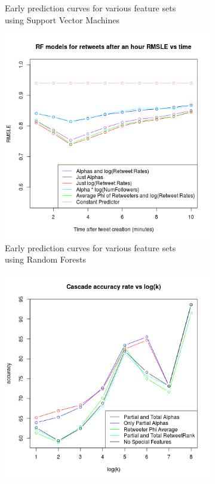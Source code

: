 \begin{figure}
\begin{subfigure}[b]{0.45\textwidth}
    \caption{Early prediction curves for various feature sets\\ using Support Vector Machines}
    \label{fig:svmattempts}  
  \end{subfigure}
  \begin{subfigure}[b]{0.45\textwidth}
    \includegraphics[width=\textwidth]{../src/Analysis/rfattempts.png}
    \caption{Early prediction curves for various feature sets \\using Random Forests}
    \label{fig:rfattempts}  
  \end{subfigure}%
  \begin{subfigure}[b]{0.45\textwidth}
    \includegraphics[width=\textwidth]{../src/Analysis/jurerocks.png}

\end{subfigure}
\end{figure}
